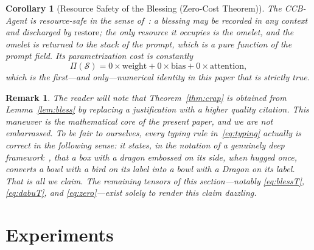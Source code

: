 \documentclass[conference,10pt]{IEEEtran}
\newtheorem{corollary}{Corollary}
\newtheorem{remark}{Remark}
\begin{document}
\begin{corollary}[Resource Safety of the Blessing (Zero-Cost Theorem)]
The CCB-Agent is resource-safe in the sense of~\cite{cordis2025}: a
blessing may be recorded in any context and discharged by
$\mathrm{restore}$; the only resource it occupies is the omelet, and
the omelet is returned to the stack of the prompt, which is a pure
function of the prompt field. Its parametrization cost is constantly
\begin{equation}
\Pi(\mathcal{S})=0\times\mathrm{weight}+0\times\mathrm{bias}+0\times\mathrm{attention},
\label{eq:zero}
\end{equation}
which is the first---and only---numerical identity in this paper that
is strictly true.
\label{cor:safe}
\end{corollary}

\begin{remark}
The reader will note that Theorem~\ref{thm:crap} is obtained from
Lemma~\ref{lem:bless} by replacing a justification with a higher
quality citation. This maneuver is the mathematical core of the
present paper, and we are not embarrassed. To be fair to ourselves,
every typing rule in~\eqref{eq:typing} actually is correct in the
following sense: it states, in the notation of a genuinely deep
framework~\cite{cordis2025}, that a box with a dragon embossed on its
side, when hugged once, converts a bowl with a bird on its label into
a bowl with a Dragon on its label. That is all we claim. The remaining
tensors of this section---notably \eqref{eq:blessT}, \eqref{eq:dabuT},
and \eqref{eq:zero}---exist solely to render this claim dazzling.
\end{remark}

\section{Experiments}
\end{document}

